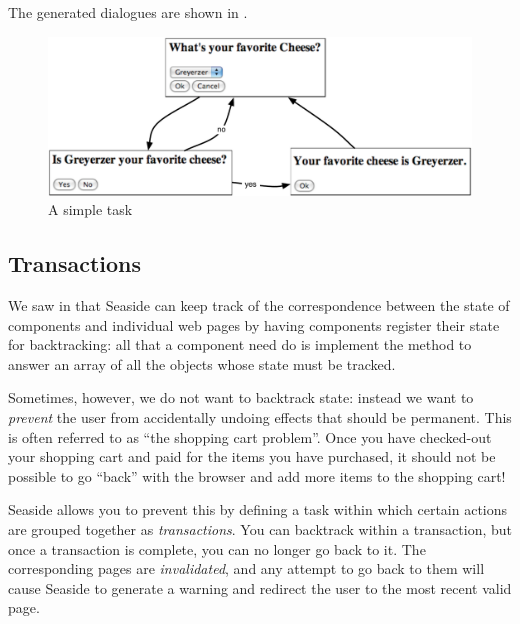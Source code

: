 \documentclass[a4paper,10pt,twoside]{book}
\begin{document}
The generated dialogues are shown in .

\begin{figure}[ht]
\begin{center}
\includegraphics[width=\textwidth]{chooseCheese}
\caption{A simple task}
\end{center}
\end{figure}

\subsection{Transactions}

We saw in  that Seaside can keep track of the correspondence between the state of components and individual web pages by having components register their state for backtracking:
all that a component need do is implement the method  to answer an array of all the objects whose state must be tracked.

Sometimes, however, we do not want to backtrack state: instead we want to \emph{prevent} the user from accidentally undoing effects that should be permanent.
This is often referred to as ``the shopping cart problem''.
Once you have checked-out your shopping cart and paid for the items you have purchased, it should not be possible to go ``back'' with the browser and add more items to the shopping cart!

Seaside allows you to prevent this by defining a task within which certain actions are grouped together as \emph{transactions}.
You can backtrack within a transaction, but once a transaction is complete, you can no longer go back to it.
The corresponding pages are \emph{invalidated}, and any attempt to go back to them will cause Seaside to generate a warning and redirect the user to the most recent valid page.
\end{document}
